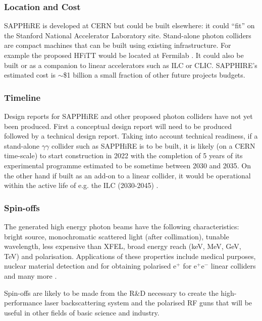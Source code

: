 \subsubsection{Location and Cost}
SAPPHiRE is developed at CERN but could be built elsewhere: it could ``fit'' on the Stanford National Accelerator Laboratory site. Stand-alone photon colliders are compact machines that can be built using existing infrastructure. For example the proposed HFiTT would be located at Fermilab \cite{Chou:Higgs}. It could also be built or as a companion to linear accelerators such as ILC or CLIC. SAPPHIRE's estimated cost is $\sim$\$1 billion \textendash a small fraction of other future projects budgets. 

\subsubsection{Timeline}
Design reports for SAPPHiRE and other proposed photon colliders have not yet been produced. First a conceptual design report will need to be produced followed by a technical design report. Taking into account technical readiness, if a stand-alone $\gamma\gamma$ collider such as SAPPHiRE is to be built, it is likely (on a CERN time-scale) to start construction in 2022 with the completion of 5 years of its experimental programme estimated to be sometime between 2030 and 2035. On the other hand if built as an add-on to a linear collider, it would be operational within the active life of e.g. the ILC (2030-2045) \cite{Blondel:HiggsF}.

\subsubsection{Spin-offs}
The generated high energy photon beams have the following characteristics: bright source, monochromatic scattered light (after collimation), tunable wavelength, less expensive than XFEL, broad energy reach (keV, MeV, GeV, TeV) and polarisation. Applications of these properties include medical purposes, nuclear material detection and for obtaining polarised e$^{+}$ for e$^{+}$e$^{-}$ linear colliders and many more \cite{Telnov:Overview}.

Spin-offs are likely to be made from the R\&D necessary to create the high-performance laser backscattering system and the polarised RF guns that will be useful in other fields of basic science and industry.

